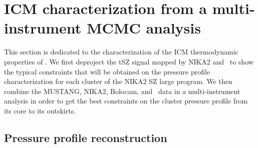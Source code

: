 \documentclass[traditabstract]{aa}
\begin{document}

\section{ICM characterization from a multi-instrument MCMC analysis}\label{sec:MCMC}

This section is dedicated to the characterization of the ICM thermodynamic properties of \psz. We first deproject the tSZ signal mapped by NIKA2 and \planck\ to show the typical constraints that will be obtained on the pressure profile characterization for each cluster of the NIKA2 SZ large program. We then combine the MUSTANG, NIKA2, Bolocam, and \planck\ data in a multi-instrument analysis in order to get the best constraints on the cluster pressure profile from its core to its outskirts.

\subsection{Pressure profile reconstruction}\label{sec:MCMC_pressure}
\end{document}
